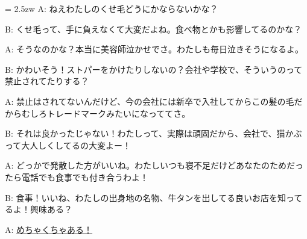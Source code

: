 \documentclass[11pt]{amsart}
\title{}
\author{}
\newenvironment{hangall}[1]{\hangindent = 2.5zw\everypar{\hangindent = 2.5zw}}{}
\begin{document}
\maketitle
\begin{hangall}{}%
A: ねえわたしのくせ毛どうにかならないかな？

B: くせ毛って、手に負えなくて大変だよね。食べ物とかも影響してるのかな？

A: そうなのかな？本当に美容師泣かせでさ。わたしも毎日泣きそうになるよ。

B: かわいそう！ストパーをかけたりしないの？会社や学校で、そういうのって禁止されてたりする？

A: 禁止はされてないんだけど、今の会社には新卒で入社してからこの髪の毛だからむしろトレードマークみたいになっててさ。

B: それは良かったじゃない！わたしって、実際は頑固だから、会社で、猫かぶって大人しくしてるの大変よー！

A: どっかで発散した方がいいね。わたしいつも寝不足だけどあなたのためだったら電話でも食事でも付き合うわよ！

B: 食事！いいね、わたしの出身地の名物、牛タンを出してる良いお店を知ってるよ！興味ある？

A: \ul{めちゃくちゃある！}\end{hangall}
\end{document}
